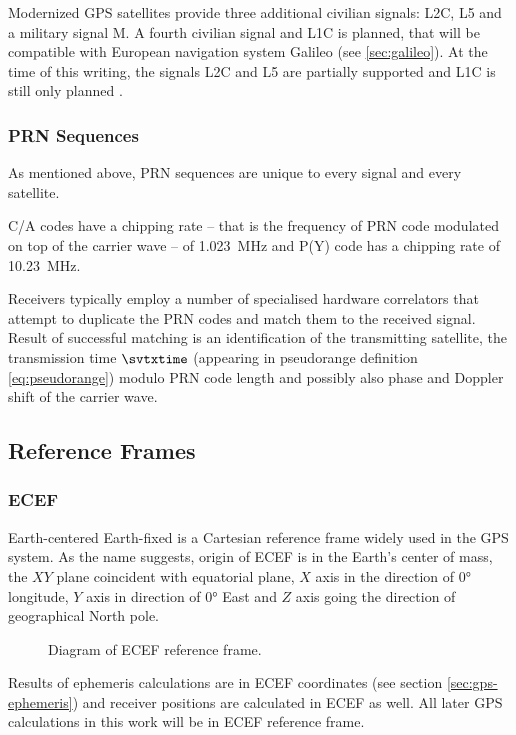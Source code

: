 Modernized GPS satellites provide three additional civilian signals:
L2C, L5 and a military signal M. A fourth civilian signal and L1C is planned, that will be compatible with
European navigation system Galileo (see \ref{sec:galileo}).
At the time of this writing, the signals L2C and L5 are partially supported and L1C is still only
planned \cite{gps-modernization-www}.

\subsubsection{PRN Sequences}
As mentioned above, PRN sequences are unique to every signal and every satellite.

C/A codes have a chipping rate -- that is the frequency of PRN code modulated on top
of the carrier wave -- of \SI{1.023}{\mega\hertz} and P(Y) code has a chipping rate
of \SI{10.23}{\mega\hertz}.

Receivers typically employ a number of specialised hardware correlators
that attempt to duplicate the PRN codes and match them to the received signal.
Result of successful matching is an identification of the transmitting satellite,
the transmission time \(\svtxtime\) (appearing in pseudorange definition \eqref{eq:pseudorange})
modulo PRN code length and possibly also phase and Doppler shift of the carrier wave.

\subsection{Reference Frames}

\subsubsection{ECEF}
Earth-centered Earth-fixed is a Cartesian reference frame widely used in the GPS system.
As the name suggests, origin of ECEF is in the Earth's center of mass, the \(XY\) plane coincident
with equatorial plane, \(X\) axis in the direction of
\ang{0} longitude, \(Y\) axis in direction of \ang{0} East and \(Z\) axis going
the direction of geographical North pole.

\begin{figure}[h]
	\centering
	
	\caption{Diagram of ECEF reference frame.}
	\label{fig:ecef}
\end{figure}

Results of ephemeris calculations are in ECEF coordinates
(see section \ref{sec:gps-ephemeris}) and receiver positions are calculated
in ECEF as well.
All later GPS calculations in this work will be in ECEF reference frame.

